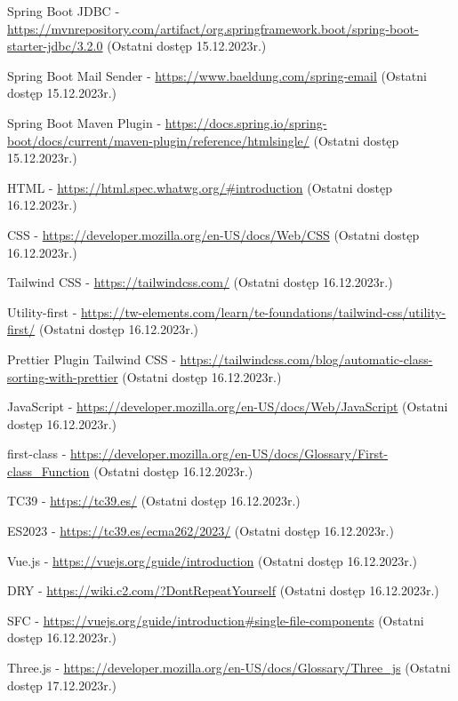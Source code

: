 \documentclass[11pt,a4paper]{article}
\begin{document}
\begin{thebibliography}{9}
Spring Boot JDBC - \url{https://mvnrepository.com/artifact/org.springframework.boot/spring-boot-starter-jdbc/3.2.0} (Ostatni dostęp 15.12.2023r.)

Spring Boot Mail Sender - \url{https://www.baeldung.com/spring-email} (Ostatni dostęp 15.12.2023r.)

Spring Boot Maven Plugin - \url{https://docs.spring.io/spring-boot/docs/current/maven-plugin/reference/htmlsingle/} (Ostatni dostęp 15.12.2023r.)

HTML - \url{https://html.spec.whatwg.org/#introduction} (Ostatni dostęp 16.12.2023r.)

CSS - \url{https://developer.mozilla.org/en-US/docs/Web/CSS} (Ostatni dostęp 16.12.2023r.)

Tailwind CSS - \url{https://tailwindcss.com/} (Ostatni dostęp 16.12.2023r.)

Utility-first - \url{https://tw-elements.com/learn/te-foundations/tailwind-css/utility-first/} (Ostatni dostęp 16.12.2023r.)

Prettier Plugin Tailwind CSS - \url{https://tailwindcss.com/blog/automatic-class-sorting-with-prettier} (Ostatni dostęp 16.12.2023r.)

JavaScript - \url{https://developer.mozilla.org/en-US/docs/Web/JavaScript} (Ostatni dostęp 16.12.2023r.)

first-class - \url{https://developer.mozilla.org/en-US/docs/Glossary/First-class_Function} (Ostatni dostęp 16.12.2023r.)

TC39 - \url{https://tc39.es/} (Ostatni dostęp 16.12.2023r.)

ES2023 - \url{https://tc39.es/ecma262/2023/} (Ostatni dostęp 16.12.2023r.)

Vue.js - \url{https://vuejs.org/guide/introduction} (Ostatni dostęp 16.12.2023r.)

DRY - \url{https://wiki.c2.com/?DontRepeatYourself} (Ostatni dostęp 16.12.2023r.)

SFC - \url{https://vuejs.org/guide/introduction#single-file-components} (Ostatni dostęp 16.12.2023r.)

Three.js - \url{https://developer.mozilla.org/en-US/docs/Glossary/Three_js} (Ostatni dostęp 17.12.2023r.)


\end{thebibliography}
\end{document}
